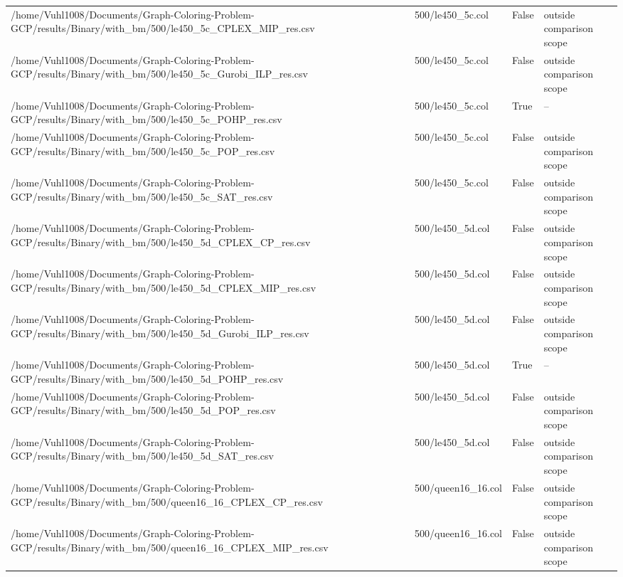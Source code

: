 \begin{table}[htbp]
\begin{tabular}{llll}
/home/Vuhl1008/Documents/Graph-Coloring-Problem-GCP/results/Binary/with\_bm/500/le450\_5c\_CPLEX\_MIP\_res.csv & 500/le450\_5c.col & False & outside comparison scope \\
/home/Vuhl1008/Documents/Graph-Coloring-Problem-GCP/results/Binary/with\_bm/500/le450\_5c\_Gurobi\_ILP\_res.csv & 500/le450\_5c.col & False & outside comparison scope \\
/home/Vuhl1008/Documents/Graph-Coloring-Problem-GCP/results/Binary/with\_bm/500/le450\_5c\_POHP\_res.csv & 500/le450\_5c.col & True & -- \\
/home/Vuhl1008/Documents/Graph-Coloring-Problem-GCP/results/Binary/with\_bm/500/le450\_5c\_POP\_res.csv & 500/le450\_5c.col & False & outside comparison scope \\
/home/Vuhl1008/Documents/Graph-Coloring-Problem-GCP/results/Binary/with\_bm/500/le450\_5c\_SAT\_res.csv & 500/le450\_5c.col & False & outside comparison scope \\
/home/Vuhl1008/Documents/Graph-Coloring-Problem-GCP/results/Binary/with\_bm/500/le450\_5d\_CPLEX\_CP\_res.csv & 500/le450\_5d.col & False & outside comparison scope \\
/home/Vuhl1008/Documents/Graph-Coloring-Problem-GCP/results/Binary/with\_bm/500/le450\_5d\_CPLEX\_MIP\_res.csv & 500/le450\_5d.col & False & outside comparison scope \\
/home/Vuhl1008/Documents/Graph-Coloring-Problem-GCP/results/Binary/with\_bm/500/le450\_5d\_Gurobi\_ILP\_res.csv & 500/le450\_5d.col & False & outside comparison scope \\
/home/Vuhl1008/Documents/Graph-Coloring-Problem-GCP/results/Binary/with\_bm/500/le450\_5d\_POHP\_res.csv & 500/le450\_5d.col & True & -- \\
/home/Vuhl1008/Documents/Graph-Coloring-Problem-GCP/results/Binary/with\_bm/500/le450\_5d\_POP\_res.csv & 500/le450\_5d.col & False & outside comparison scope \\
/home/Vuhl1008/Documents/Graph-Coloring-Problem-GCP/results/Binary/with\_bm/500/le450\_5d\_SAT\_res.csv & 500/le450\_5d.col & False & outside comparison scope \\
/home/Vuhl1008/Documents/Graph-Coloring-Problem-GCP/results/Binary/with\_bm/500/queen16\_16\_CPLEX\_CP\_res.csv & 500/queen16\_16.col & False & outside comparison scope \\
/home/Vuhl1008/Documents/Graph-Coloring-Problem-GCP/results/Binary/with\_bm/500/queen16\_16\_CPLEX\_MIP\_res.csv & 500/queen16\_16.col & False & outside comparison scope \\

\end{tabular}
\end{table}
